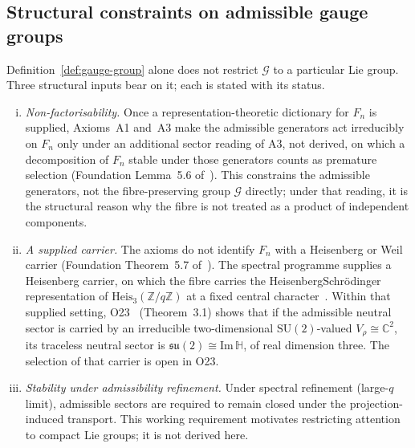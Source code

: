 \documentclass[11pt,a4paper]{article}
\begin{document}
  \subsection{Structural constraints on admissible gauge groups}
    \label{subsec:gauge-constraints}

    Definition~\ref{def:gauge-group} alone does not restrict $\mathcal{G}$ to a particular
    Lie group.
    Three structural inputs bear on it; each is stated with its status.

    \begin{enumerate}[(i)]
        \item \emph{Non-factorisability.}
        Once a representation-theoretic dictionary for $F_n$ is supplied, Axioms~A1 and~A3 make the
        admissible generators act irreducibly on $F_n$ only under an additional sector reading of A3,
        not derived, on which a decomposition of $F_n$ stable under those generators counts as premature
        selection (Foundation Lemma~5.6 of~\cite{Beau2026m}).
        This constrains the admissible generators, not the fibre-preserving group
        $\mathcal{G}$ directly; under that reading, it is the structural reason why the fibre is not treated
        as a product of independent components.

        \item \emph{A supplied carrier.}
        The axioms do not identify $F_n$ with a Heisenberg or Weil carrier (Foundation
        Theorem~5.7 of~\cite{Beau2026m}).
        The spectral programme supplies a Heisenberg carrier, on which the fibre carries the
        Heisenberg\textendash Schr\"odinger representation of
        $\mathrm{Heis}_3(\mathbb{Z}/q\mathbb{Z})$ at a fixed central character~\cite{Beau2026q5a}.
        Within that supplied setting, O23~\cite{Beau2026a27} (Theorem~3.1) shows that if the
        admissible neutral sector is carried by an irreducible two-dimensional
        $\mathrm{SU}(2)$-valued $V_\rho \cong \mathbb{C}^2$, its traceless neutral sector is
        $\mathfrak{su}(2) \cong \mathrm{Im}\,\mathbb{H}$, of real dimension three.
        The selection of that carrier is open in O23.

        \item \emph{Stability under admissibility refinement.}
        Under spectral refinement (large-$q$ limit), admissible sectors are required to remain
        closed under the projection-induced transport.
        This working requirement motivates restricting attention to compact Lie groups; it is
        not derived here.
    \end{enumerate}
\end{document}
